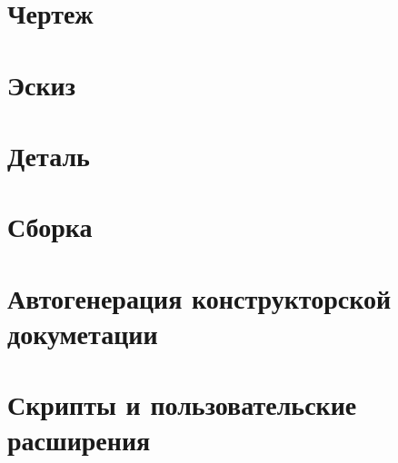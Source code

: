 \section{Чертеж}

\section{Эскиз}

\section{Деталь}

\section{Сборка}

\section{Автогенерация конструкторской докуметации}

\section{Скрипты и пользовательские расширения}

